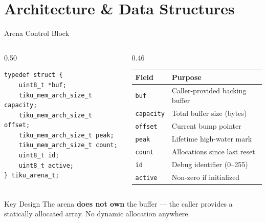 \documentclass[aspectratio=169, 10pt]{beamer}
\begin{document}
\section{Architecture \& Data Structures}

\begin{frame}[fragile]{Arena Control Block}
\begin{columns}[T]
\begin{column}{0.50\textwidth}
\begin{lstlisting}[style=cstyle, title={kernel/memory/tiku\_mem.h}]
typedef struct {
    uint8_t *buf;
    tiku_mem_arch_size_t capacity;
    tiku_mem_arch_size_t offset;
    tiku_mem_arch_size_t peak;
    tiku_mem_arch_size_t count;
    uint8_t id;
    uint8_t active;
} tiku_arena_t;
\end{lstlisting}
\end{column}

\begin{column}{0.46\textwidth}
\begin{tabular}{@{}lp{4.5cm}@{}}
\toprule
\textbf{Field} & \textbf{Purpose} \\
\midrule
\texttt{buf}      & Caller-provided backing buffer \\
\texttt{capacity} & Total buffer size (bytes) \\
\texttt{offset}   & Current bump pointer \\
\texttt{peak}     & Lifetime high-water mark \\
\texttt{count}    & Allocations since last reset \\
\texttt{id}       & Debug identifier (0--255) \\
\texttt{active}   & Non-zero if initialized \\
\bottomrule
\end{tabular}
\end{column}
\end{columns}

\vspace{0.5em}
\begin{block}{Key Design}
The arena \textbf{does not own} the buffer --- the caller provides a
statically allocated array. No dynamic allocation anywhere.
\end{block}
\end{frame}
\end{document}
